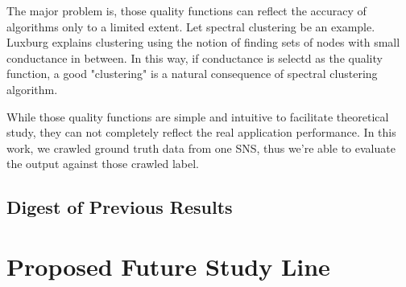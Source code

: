 \documentclass[11pt,a4paper]{article}
\begin{document}
The major problem is, those quality functions can reflect 
the accuracy of algorithms only to a limited extent. 
Let spectral clustering be an example. Luxburg\cite{von2007tutorial}
explains clustering using the notion of finding sets of nodes 
with small conductance in between. In this way, if conductance 
is selectd as the quality function, a good "clustering" is 
a natural consequence of spectral clustering algorithm. 

While those quality functions are simple and intuitive to 
facilitate theoretical study, they can not completely reflect the 
real application performance. In this work, we crawled ground truth
data from one SNS, thus we're able to evaluate the output 
against those crawled label. 



\subsection{Digest of Previous Results}

\section{Proposed Future Study Line}




\end{document}
